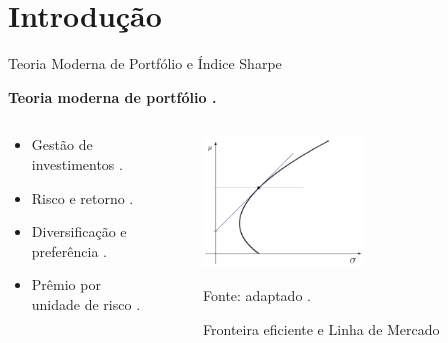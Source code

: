 \section{Introdução}


    \begin{frame}{Teoria Moderna de Portfólio e Índice Sharpe}
        
        \LARGE \textbf{Teoria moderna de portfólio \cite{markowitz1952portfolio}.}

        \Large
        \begin{columns}
            \begin{column}{0.5\textwidth}
                \begin{itemize}
                    \item Gestão de investimentos \cite{sethi2021nobel}.
                    \item Risco e retorno \cite{sharpe1964capital}.
                    \item Diversificação e preferência \cite{lintner1965valuation}.
                    \item Prêmio por unidade de risco \cite{sharpe1994sharpe}.
                \end{itemize}

            \end{column}
            \begin{column}{0.5\textwidth}
                \begin{figure}
                    \centering
                    \caption{Fronteira eficiente e Linha de Mercado}
                    \includegraphics[width=0.6\textwidth]{images/fronteira_eficiente.png}
                    \par \footnotesize Fonte: adaptado \citeauthor{mansini2015linear}.
                \end{figure}
            \end{column}
        \end{columns}
        

    \end{frame}
